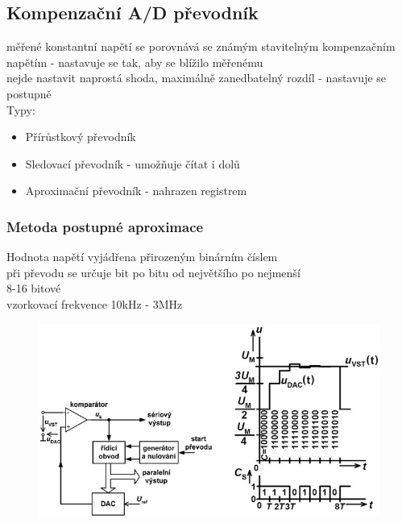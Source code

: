 \subsection*{Kompenzační A/D převodník}
měřené konstantní napětí se porovnává se známým stavitelným kompenzačním napětím - nastavuje se tak, aby se blížilo měřenému\\
nejde nastavit naprostá shoda, maximálně zanedbatelný rozdíl - nastavuje se postupně\\
Typy:
\begin{itemize}
    \item Přírůstkový převodník
    \item Sledovací převodník - umožňuje čítat i dolů
    \item Aproximační převodník - nahrazen registrem
\end{itemize}
\subsubsection*{Metoda postupné aproximace}
Hodnota napětí vyjádřena přirozeným binárním číslem\\
při převodu se určuje bit po bitu od největšího po nejmenší\\
8-16 bitové\\
vzorkovací frekvence 10kHz - 3MHz\\
\begin{figure}[H]
    \includegraphics*[scale = 1]{images/adc_kompenzacni_aprox.png}
\end{figure}
\newpage

